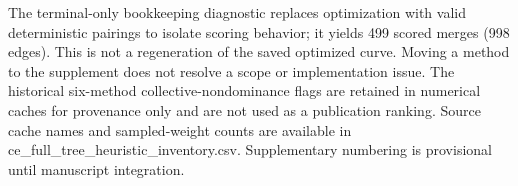 \documentclass[10pt,letterpaper]{article}
\begin{document}
\begin{table}[p]
\centering
\small
\caption{\textbf{Historical single-embryo heuristic inventory and audit status.}
All six methods are listed, including the held terminal-only method. Status
distinguishes structural checks performed by the publication pipeline from
code-inspection findings and unverified scalar-cost caches. ``Measured''
identifies the source of states; it does not imply fixed identities or
equivalent reconstruction constraints.}
\label{tab:ce_full_tree_heuristic_inventory}

\vspace{3mm}
\begin{minipage}{0.98\textwidth}
\footnotesize
The terminal-only bookkeeping diagnostic replaces optimization with valid
deterministic pairings to isolate scoring behavior; it yields 499 scored
merges (998 edges). This is not a regeneration of the saved optimized curve.
Moving a method to the supplement does not resolve a scope or implementation
issue. The historical six-method collective-nondominance flags are retained
in numerical caches for provenance only and are not used as a publication
ranking. Source cache names and sampled-weight counts are available in
ce\_full\_tree\_heuristic\_inventory.csv. Supplementary numbering
is provisional until manuscript integration.
\end{minipage}
\end{table}
\end{document}
